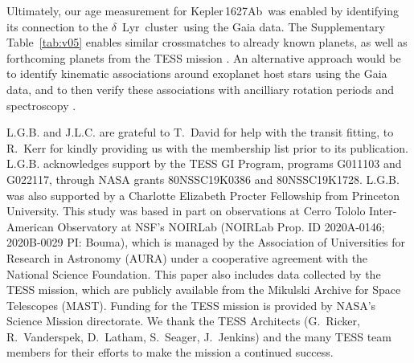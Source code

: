 \documentclass[12pt,modern,twocolumn,tighten]{aastex63}
\newcommand{\cn}{$\delta$~Lyr\ cluster} %
\newcommand{\pn}{Kepler\,1627Ab} %
\begin{document}
Ultimately, our age measurement for \pn\ was enabled by identifying
its connection to the \cn\ using the Gaia data.  The Supplementary
Table~\ref{tab:v05} enables similar crossmatches to already known
planets, as well as forthcoming planets from the TESS mission
\citep{ricker_transiting_2015,guerrero_tess_2021}.  An alternative
approach would be to identify kinematic associations around exoplanet
host stars using the Gaia data, and to then verify these associations
with ancilliary rotation periods and spectroscopy
\citep{tofflemire_tess_2021}.







\acknowledgements
\raggedbottom

L.G.B{.} and J.L.C{.} are grateful to T{.}~David for help with the
transit fitting, to R{.}~Kerr for kindly providing us with the
\citet{kerr_stars_2021} membership list prior to its publication.
%
L.G.B{.} acknowledges support by the TESS GI Program, programs
G011103 and G022117, through NASA grants 80NSSC19K0386 and
80NSSC19K1728.
%
L.G.B{.} was also supported by a Charlotte Elizabeth Procter
Fellowship from Princeton University.
%
This study was based in part on observations at Cerro Tololo
Inter-American Observatory at NSF's NOIRLab (NOIRLab Prop{.} ID
2020A-0146; 2020B-0029 PI: Bouma), which is managed by the
Association of Universities for Research in Astronomy (AURA) under a
cooperative agreement with the National Science Foundation.
%
%
This paper also includes data collected by the TESS mission, which are
publicly available from the Mikulski Archive for Space Telescopes
(MAST).
%
Funding for the TESS mission is provided by NASA's Science Mission
directorate.
%
We thank the TESS Architects (G.~Ricker, R.~Vanderspek, D.~Latham,
S.~Seager, J.~Jenkins) and the many TESS team members for their
efforts to make the mission a continued success.
%

%
%
\end{document}
